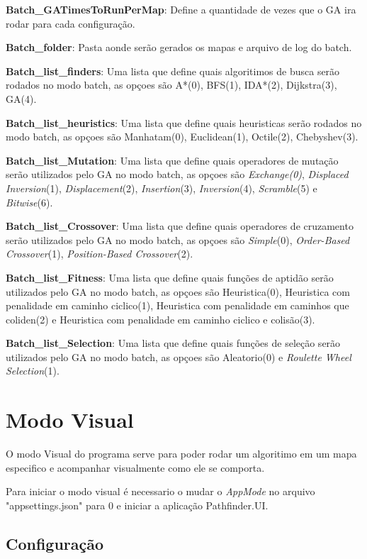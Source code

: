 \textbf{Batch\_GATimesToRunPerMap}: Define a quantidade de vezes que o GA ira rodar para cada configuração.

\textbf{Batch\_folder}: Pasta aonde serão gerados os mapas e arquivo de log do batch.

\textbf{Batch\_list\_finders}: Uma lista que define quais algoritimos de busca serão rodados no modo batch, as opçoes são  A\**(0), BFS(1), IDA\**(2), Dijkstra(3), GA(4).

\textbf{Batch\_list\_heuristics}: Uma lista que define quais heuristicas serão rodados no modo batch, as opçoes são Manhatam(0), Euclidean(1), Octile(2), Chebyshev(3).

\textbf{Batch\_list\_Mutation}: Uma lista que define quais operadores de mutação serão utilizados pelo GA no modo batch, as opçoes são  \textit{Exchange(0)}, \textit{Displaced Inversion}(1), \textit{Displacement}(2), \textit{Insertion}(3), \textit{Inversion}(4), \textit{Scramble}(5) e \textit{Bitwise}(6).

\textbf{Batch\_list\_Crossover}: Uma lista que define quais operadores de cruzamento serão utilizados pelo GA no modo batch, as opçoes são  \textit{Simple}(0), \textit{Order-Based Crossover}(1), \textit{Position-Based Crossover}(2).

\textbf{Batch\_list\_Fitness}: Uma lista que define quais funções de aptidão serão utilizados pelo GA no modo batch, as opçoes são Heuristica(0), Heuristica com penalidade em caminho ciclico(1), Heuristica com penalidade em caminhos que coliden(2) e Heuristica com penalidade em caminho ciclico e colisão(3).

\textbf{Batch\_list\_Selection}: Uma lista que define quais funções de seleção serão utilizados pelo GA no modo batch, as opçoes são  Aleatorio(0) e \textit{Roulette Wheel Selection}(1).

\section{Modo Visual}

O modo Visual do programa serve para poder rodar um algoritimo em um mapa especifico e acompanhar visualmente como ele se comporta.

Para iniciar o modo visual é necessario o mudar o \textit{AppMode} no arquivo "appsettings.json" para 0 e iniciar a aplicação Pathfinder.UI.


\subsection{Configuração}


